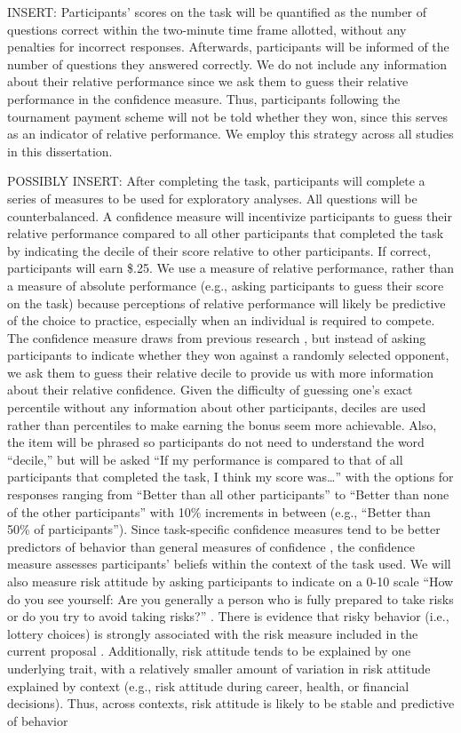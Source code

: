 \documentclass[a4paper,nobind]{templates/ociamthesis}
\begin{document}
INSERT: Participants' scores on the task will be quantified as the number of questions correct within the two-minute time frame allotted, without any penalties for incorrect responses. Afterwards, participants will be informed of the number of questions they answered correctly. We do not include any information about their relative performance since we ask them to guess their relative performance in the confidence measure. Thus, participants following the tournament payment scheme will not be told whether they won, since this serves as an indicator of relative performance. We employ this strategy across all studies in this dissertation.

POSSIBLY INSERT:
After completing the task, participants will complete a series of measures to be used for exploratory analyses. All questions will be counterbalanced. A confidence measure will incentivize participants to guess their relative performance compared to all other participants that completed the task by indicating the decile of their score relative to other participants. If correct, participants will earn \$.25. We use a measure of relative performance, rather than a measure of absolute performance (e.g., asking participants to guess their score on the task) because perceptions of relative performance will likely be predictive of the choice to practice, especially when an individual is required to compete. The confidence measure draws from previous research \autocite{Niederle2007}, but instead of asking participants to indicate whether they won against a randomly selected opponent, we ask them to guess their relative decile to provide us with more information about their relative confidence. Given the difficulty of guessing one's exact percentile without any information about other participants, deciles are used rather than percentiles to make earning the bonus seem more achievable. Also, the item will be phrased so participants do not need to understand the word ``decile,'' but will be asked ``If my performance is compared to that of all participants that completed the task, I think my score was\ldots{}'' with the options for responses ranging from ``Better than all other participants'' to ``Better than none of the other participants'' with 10\% increments in between (e.g., ``Better than 50\% of participants''). Since task-specific confidence measures tend to be better predictors of behavior than general measures of confidence \autocite[see][ for review]{Oney2015}, the confidence measure assesses participants' beliefs within the context of the task used. We will also measure risk attitude by asking participants to indicate on a 0-10 scale ``How do you see yourself: Are you generally a person who is fully prepared to take risks or do you try to avoid taking risks?'' \autocite{Dohmen2011b}. There is evidence that risky behavior (i.e., lottery choices) is strongly associated with the risk measure included in the current proposal \autocite{Dohmen2011b}. Additionally, risk attitude tends to be explained by one underlying trait, with a relatively smaller amount of variation in risk attitude explained by context (e.g., risk attitude during career, health, or financial decisions). Thus, across contexts, risk attitude is likely to be stable and predictive of behavior 
\end{document}
